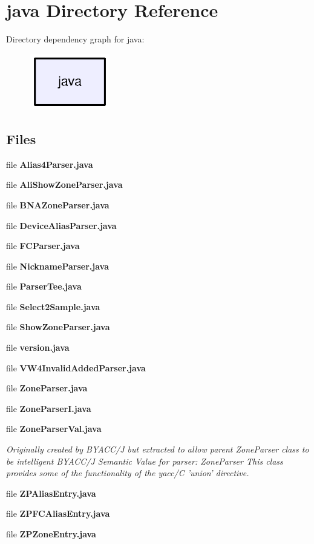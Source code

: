 \section{java Directory Reference}
\label{dir_93c6ba7fb77bae0709fae89c9c13b44a}
Directory dependency graph for java\+:\nopagebreak
\begin{figure}[H]
\begin{center}
\leavevmode
\includegraphics[width=98pt]{dir_93c6ba7fb77bae0709fae89c9c13b44a_dep}
\end{center}
\end{figure}
\subsection*{Files}
\begin{DoxyCompactItemize}
\item 
file {\bf Alias4\+Parser.\+java}
\item 
file {\bf Ali\+Show\+Zone\+Parser.\+java}
\item 
file {\bf B\+N\+A\+Zone\+Parser.\+java}
\item 
file {\bf Device\+Alias\+Parser.\+java}
\item 
file {\bf F\+C\+Parser.\+java}
\item 
file {\bf Nickname\+Parser.\+java}
\item 
file {\bf Parser\+Tee.\+java}
\item 
file {\bf Select2\+Sample.\+java}
\item 
file {\bf Show\+Zone\+Parser.\+java}
\item 
file {\bf version.\+java}
\item 
file {\bf V\+W4\+Invalid\+Added\+Parser.\+java}
\item 
file {\bf Zone\+Parser.\+java}
\item 
file {\bf Zone\+Parser\+I.\+java}
\item 
file {\bf Zone\+Parser\+Val.\+java}
\begin{DoxyCompactList}\small\item\em Originally created by B\+Y\+A\+C\+C/\+J but extracted to allow parent Zone\+Parser class to be intelligent B\+Y\+A\+C\+C/\+J Semantic Value for parser\+: Zone\+Parser This class provides some of the functionality of the yacc/\+C 'union' directive. \end{DoxyCompactList}\item 
file {\bf Z\+P\+Alias\+Entry.\+java}
\item 
file {\bf Z\+P\+F\+C\+Alias\+Entry.\+java}
\item 
file {\bf Z\+P\+Zone\+Entry.\+java}
\end{DoxyCompactItemize}
